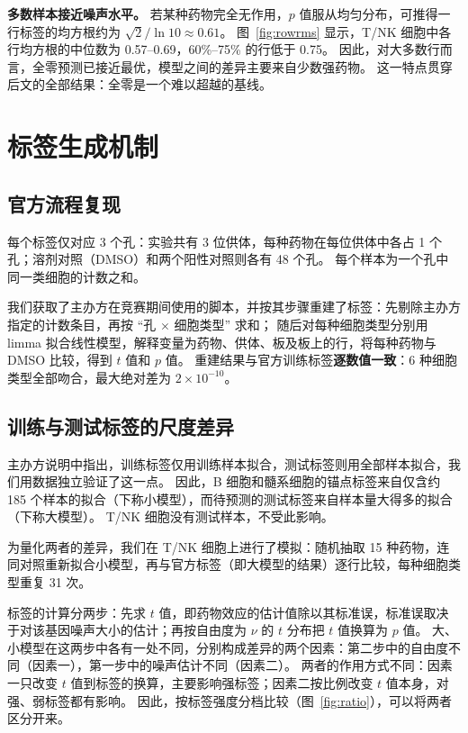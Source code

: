 \documentclass[11pt,a4paper]{article}
\begin{document}
\textbf{多数样本接近噪声水平。}
若某种药物完全无作用，$p$ 值服从均匀分布，可推得一行标签的均方根约为 $\sqrt{2}/\ln 10 \approx 0.61$。
图~\ref{fig:rowrms} 显示，T/NK 细胞中各行均方根的中位数为 0.57--0.69，60\%--75\% 的行低于 0.75。
因此，对大多数行而言，全零预测已接近最优，模型之间的差异主要来自少数强药物。
这一特点贯穿后文的全部结果：全零是一个难以超越的基线。

\section{标签生成机制}

\subsection{官方流程复现}
每个标签仅对应 3 个孔：实验共有 3 位供体，每种药物在每位供体中各占 1 个孔；溶剂对照（DMSO）和两个阳性对照则各有 48 个孔。
每个样本为一个孔中同一类细胞的计数之和。

我们获取了主办方在竞赛期间使用的脚本，并按其步骤重建了标签：先剔除主办方指定的计数条目，再按 ``孔 $\times$ 细胞类型'' 求和；
随后对每种细胞类型分别用 limma 拟合线性模型，解释变量为药物、供体、板及板上的行，将每种药物与 DMSO 比较，得到 $t$ 值和 $p$ 值。
重建结果与官方训练标签\textbf{逐数值一致}：6 种细胞类型全部吻合，最大绝对差为 $2\times10^{-10}$。

\subsection{训练与测试标签的尺度差异}
主办方说明中指出，训练标签仅用训练样本拟合，测试标签则用全部样本拟合，我们用数据独立验证了这一点。
因此，B 细胞和髓系细胞的锚点标签来自仅含约 185 个样本的拟合（下称小模型），而待预测的测试标签来自样本量大得多的拟合（下称大模型）。
T/NK 细胞没有测试样本，不受此影响。

为量化两者的差异，我们在 T/NK 细胞上进行了模拟：随机抽取 15 种药物，连同对照重新拟合小模型，再与官方标签（即大模型的结果）逐行比较，每种细胞类型重复 31 次。

标签的计算分两步：先求 $t$ 值，即药物效应的估计值除以其标准误，标准误取决于对该基因噪声大小的估计；再按自由度为 $\nu$ 的 $t$ 分布把 $t$ 值换算为 $p$ 值。
大、小模型在这两步中各有一处不同，分别构成差异的两个因素：第二步中的自由度不同（因素一），第一步中的噪声估计不同（因素二）。
两者的作用方式不同：因素一只改变 $t$ 值到标签的换算，主要影响强标签；因素二按比例改变 $t$ 值本身，对强、弱标签都有影响。
因此，按标签强度分档比较（图~\ref{fig:ratio}），可以将两者区分开来。
\end{document}
